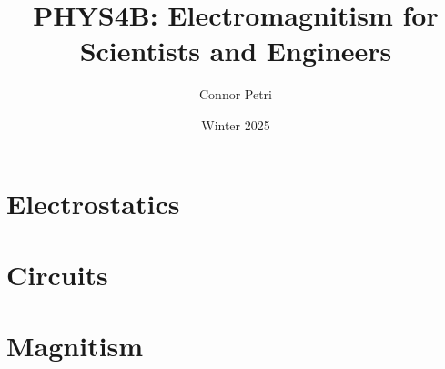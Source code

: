 \documentclass[12pt, letterpaper]{article}
\title{PHYS4B: Electromagnitism for \\Scientists and Engineers}
\author{Connor Petri}
\date{Winter 2025}
\begin{document}
\maketitle

\pagebreak

\tableofcontents

\pagebreak

\section{Electrostatics}




\section{Circuits}




\section{Magnitism}

\end{document}
